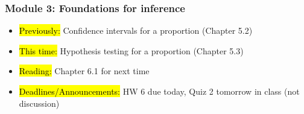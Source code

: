 
\begin{frame}
    \frametitle{Module 3: Foundations for inference}
    \begin{itemize}
        \item \hl{Previously: }Confidence intervals for a proportion (Chapter 5.2)
        \item \hl{This time: }Hypothesis testing for a proportion (Chapter 5.3)
        \item \hl{Reading: }Chapter 6.1 for next time
        \item \hl{Deadlines/Announcements: }HW 6 due today, Quiz 2 tomorrow in class (not discussion)
    \end{itemize}
    
\end{frame}